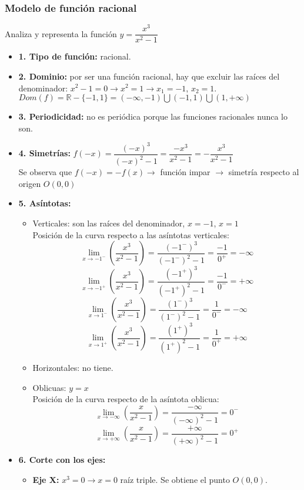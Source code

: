 
\subsubsection{Modelo de función racional}
Analiza y representa la función $y=\dfrac{x^3}{x^2-1}$
\begin{itemize}
	\item \textbf{1. Tipo de función: }racional.
	\item \textbf{2. Dominio: }por ser una función racional, hay que excluir las raíces del denominador: $x^2-1=0 \rightarrow x^2=1 \rightarrow x_1=-1$, $x_2=1$.\\
	$Dom(f) = \mathbb{R}-\{-1,1\} = (-\infty, -1) \bigcup (-1,1) \bigcup (1,+\infty)$
	\item \textbf{3. Periodicidad: }no es periódica porque las funciones racionales nunca lo son.
	\item \textbf{4. Simetrías: }$f(-x)=\dfrac{(-x)^3}{(-x)^2-1}=\dfrac{-x^3}{x^2-1}=-\dfrac{x^3}{x^2-1}$\\
	Se observa que $f(-x) = -f(x) \rightarrow$ función impar $\rightarrow$ simetría respecto al origen $O(0,0)$
	\item \textbf{5. Asíntotas: }
	\begin{itemize}
		\item Verticales: son las raíces del denominador, $x=-1$, $x=1$\\
		Posición de la curva respecto a las asíntotas verticales:\\
		$$\lim_{x \to -1^{-}}(\dfrac{x^3}{x^2-1})=\dfrac{(-1^{-})^3}{(-1^{-})^2-1}=\dfrac{-1}{0^{+}}=-\infty$$
		$$\lim_{x \to -1^{+}}(\dfrac{x^3}{x^2-1})=\dfrac{(-1^{+})^3}{(-1^{+})^2-1}=\dfrac{-1}{0^{-}}=+\infty$$
		$$\lim_{x \to 1^{-}}(\dfrac{x^3}{x^2-1})=\dfrac{(1^{-})^3}{(1^{-})^2-1}=\dfrac{1}{0^{-}}=-\infty$$
		$$\lim_{x \to 1^{+}}(\dfrac{x^3}{x^2-1})=\dfrac{(1^{+})^3}{(1^{+})^2-1}=\dfrac{1}{0^{+}}=+\infty$$
		\item Horizontales: no tiene.
		\item Oblicuas: $y=x$\\
		Posición de la curva respecto de la asíntota oblicua:
		$$\lim_{x \to -\infty}(\dfrac{x}{x^2-1})=\dfrac{-\infty}{(-\infty)^2-1}=0^{-}$$
		$$\lim_{x \to +\infty}(\dfrac{x}{x^2-1})=\dfrac{+\infty}{(+\infty)^2-1}=0^{+}$$
	\end{itemize}
	\item \textbf{6. Corte con los ejes:}
	\begin{itemize}
		\item \textbf{Eje X: }$x^3=0 \rightarrow x=0$ raíz triple. Se obtiene el punto $O(0,0)$.

\end{itemize}
\end{itemize}
